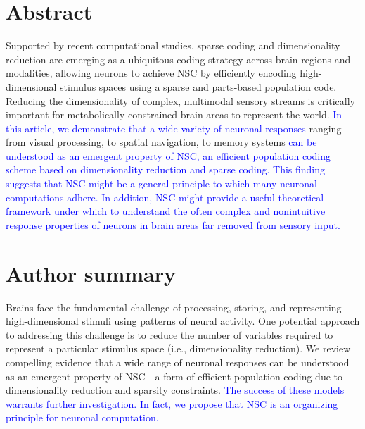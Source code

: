 \documentclass[10pt,letterpaper]{article}
\newcommand{\revise}[1]{\textcolor{blue}{#1}}
\begin{document}
\section*{Abstract}
Supported by recent computational studies, sparse coding and dimensionality reduction are emerging as a ubiquitous coding strategy  across brain regions and modalities, allowing neurons to achieve \acf{NSC} by efficiently encoding high-dimensional stimulus spaces using a sparse and parts-based population code. Reducing the dimensionality of complex, multimodal sensory streams is critically important for metabolically constrained brain areas to represent the world.
\revise{In this article, we demonstrate that a wide variety of neuronal responses}
ranging from visual processing, to spatial navigation, to memory systems
\revise{can be understood as an emergent property of \acf{NSC},
an efficient population coding scheme
based on dimensionality reduction and sparse coding.}
\revise{This finding suggests that \acs{NSC} might be a general principle
to which many neuronal computations adhere.
In addition, \acs{NSC} might provide a useful theoretical framework under which
to understand the often complex and nonintuitive response properties
of neurons in brain areas far removed from sensory input.}



\section*{Author summary}
Brains face the fundamental challenge of processing, storing, and representing high-dimensional stimuli using patterns of neural activity. One potential approach to addressing this challenge is to reduce the number of variables required to represent a particular stimulus space (i.e., dimensionality reduction).
We review compelling evidence that a wide range of neuronal responses can be understood as an emergent property of \acf{NSC}---a form of efficient population coding due to dimensionality reduction and sparsity constraints.
\revise{The success of these models warrants further investigation.
In fact, we propose that \acs{NSC} is an organizing principle for neuronal computation.}
\end{document}
